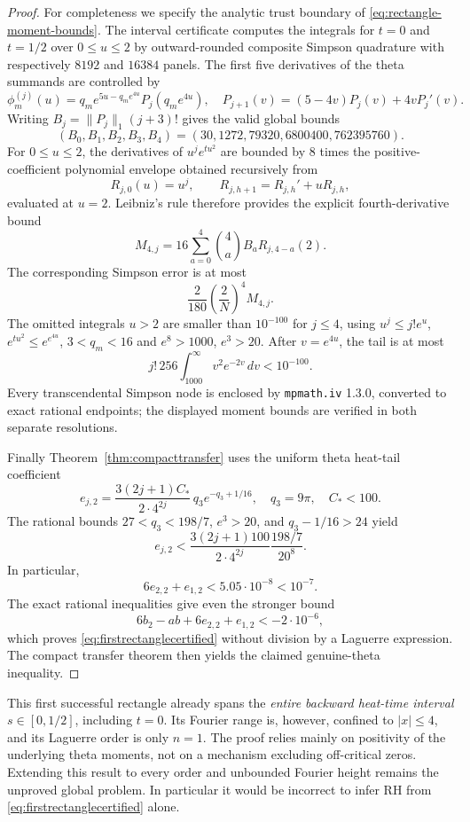 \begin{proof}
For completeness we specify the analytic
trust boundary of \eqref{eq:rectangle-moment-bounds}.
The interval certificate computes the integrals
for $t=0$ and $t=1/2$ over $0\le u\le2$
by outward-rounded composite Simpson quadrature
with respectively $8192$ and $16384$ panels.
The first five derivatives of the theta summands
are controlled by
\[
\phi_m^{(j)}(u)=q_me^{5u-q_me^{4u}}
P_j(q_me^{4u}),\quad
P_{j+1}(v)=(5-4v)P_j(v)+4vP_j'(v).
\]
Writing $B_j=\|P_j\|_1(j+3)!$
gives the valid global bounds
\[
(B_0,B_1,B_2,B_3,B_4)
=(30,1272,79320,6800400,762395760).
\]
For $0\le u\le2$, the derivatives of
$u^j e^{tu^2}$ are bounded by $8$
times the positive-coefficient polynomial
envelope obtained recursively from
\[
R_{j,0}(u)=u^j,\qquad
R_{j,h+1}=R_{j,h}'+uR_{j,h},
\]
evaluated at $u=2$.
Leibniz's rule therefore provides the
explicit fourth-derivative bound
\[
M_{4,j}=
16\sum_{a=0}^4{4\choose a}
B_aR_{j,4-a}(2).
\]
The corresponding Simpson error is at most
\[
\frac2{180}\left(\frac2N\right)^4M_{4,j}.
\]
The omitted integrals $u>2$ are smaller
than $10^{-100}$ for $j\le4$, using
$u^j\le j!e^u$, $e^{tu^2}\le e^{e^{4u}}$,
$3<q_m<16$ and
$e^8>1000$, $e^3>20$.
After $v=e^{4u}$, the tail is at most
\[
j!\,256\int_{1000}^\infty
v^2e^{-2v}\,dv
<10^{-100}.
\]
Every transcendental Simpson node is
enclosed by \texttt{mpmath.iv} 1.3.0,
converted to exact rational endpoints;
the displayed moment bounds are
verified in both separate resolutions.

Finally Theorem~\ref{thm:compacttransfer}
uses the uniform theta heat-tail
coefficient
\[
e_{j,2}
=\frac{3(2j+1)C_*}{2\cdot4^{2j}}\,
q_3e^{-q_3+1/16},\quad q_3=9\pi,\quad C_*<100.
\]
The rational bounds $27<q_3<198/7$,
$e^3>20$, and $q_3-1/16>24$ yield
\[
e_{j,2}<
\frac{3(2j+1)100}{2\cdot4^{2j}}
\frac{198/7}{20^8}.
\]
In particular,
\[
6e_{2,2}+e_{1,2}
<5.05\cdot10^{-8}<10^{-7}.
\]
The exact rational inequalities give even the
stronger bound
\[
6b_2-ab+6e_{2,2}+e_{1,2}<-2\cdot10^{-6},
\]
which proves \eqref{eq:firstrectanglecertified}
without division by a Laguerre expression.
The compact transfer theorem then yields the
claimed genuine-theta inequality.
\end{proof}

This first successful rectangle already spans
the \emph{entire backward heat-time interval}
$s\in[0,1/2]$, including $t=0$.
Its Fourier range is, however, confined to
$|x|\le4$, and its Laguerre order is only
$n=1$. The proof relies mainly on
positivity of the underlying theta moments,
not on a mechanism excluding off-critical
zeros. Extending this result to every order
and unbounded Fourier height remains the
unproved global problem. In particular it
would be incorrect to infer RH from
\eqref{eq:firstrectanglecertified} alone.

